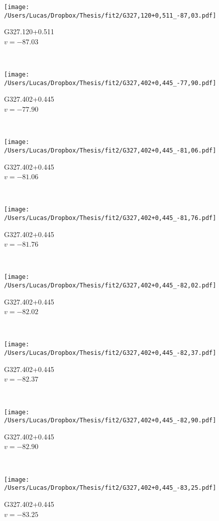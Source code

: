 \begin{figure*}[t]\ContinuedFloat
	\centering
	\begin{subfigure}[t]{0.3\textwidth}
		\texttt{[image: /Users/Lucas/Dropbox/Thesis/fit2/G327,120+0,511\_-87,03.pdf]}
		\caption[]{G327.120+0.511\\$v=-87.03$\,\kms}
	\end{subfigure}
	~
	\begin{subfigure}[t]{0.3\textwidth}
		\texttt{[image: /Users/Lucas/Dropbox/Thesis/fit2/G327,402+0,445\_-77,90.pdf]}
		\caption[]{G327.402+0.445\\$v=-77.90$\,\kms}
	\end{subfigure}
	~
	\begin{subfigure}[t]{0.3\textwidth}
		\texttt{[image: /Users/Lucas/Dropbox/Thesis/fit2/G327,402+0,445\_-81,06.pdf]}
		\caption[]{G327.402+0.445\\$v=-81.06$\,\kms}
	\end{subfigure}
	~
	\begin{subfigure}[t]{0.3\textwidth}
		\texttt{[image: /Users/Lucas/Dropbox/Thesis/fit2/G327,402+0,445\_-81,76.pdf]}
		\caption[]{G327.402+0.445\\$v=-81.76$\,\kms}
	\end{subfigure}
	~
	\begin{subfigure}[t]{0.3\textwidth}
		\texttt{[image: /Users/Lucas/Dropbox/Thesis/fit2/G327,402+0,445\_-82,02.pdf]}
		\caption[]{G327.402+0.445\\$v=-82.02$\,\kms}
	\end{subfigure}
	~
	\begin{subfigure}[t]{0.3\textwidth}
		\texttt{[image: /Users/Lucas/Dropbox/Thesis/fit2/G327,402+0,445\_-82,37.pdf]}
		\caption[]{G327.402+0.445\\$v=-82.37$\,\kms}
	\end{subfigure}
	~
	\begin{subfigure}[t]{0.3\textwidth}
		\texttt{[image: /Users/Lucas/Dropbox/Thesis/fit2/G327,402+0,445\_-82,90.pdf]}
		\caption[]{G327.402+0.445\\$v=-82.90$\,\kms}
	\end{subfigure}
	~
	\begin{subfigure}[t]{0.3\textwidth}
		\texttt{[image: /Users/Lucas/Dropbox/Thesis/fit2/G327,402+0,445\_-83,25.pdf]}
		\caption[]{G327.402+0.445\\$v=-83.25$\,\kms}

\end{subfigure}
\end{figure*}
